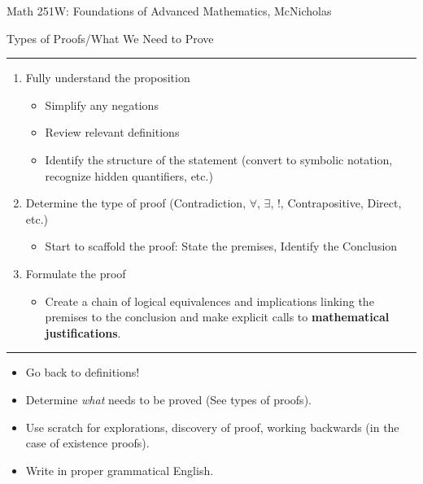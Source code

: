 \documentclass{article}
\begin{document}
	\newpage
	\hfill\tiny{Math 251W: Foundations of Advanced Mathematics, McNicholas}

	\vspace{0.3cm}
	\centerline{\Large{Types of Proofs/What We Need to Prove}}
	\vspace{0.3cm}
	\hrule
	\vspace{0.3cm}
	\vspace{.5cm}

	\normalsize
	\begin{enumerate}
		\item Fully understand the proposition
		\begin{itemize}
			\item Simplify any negations
			\item Review relevant definitions
			\item Identify the structure of the statement (convert to symbolic notation, recognize hidden quantifiers, etc.)
		\end{itemize}
		\item Determine the type of proof (Contradiction, $\forall$, $\exists$, $!$, Contrapositive, Direct, etc.)
		\begin{itemize}
			\item Start to scaffold the proof: State the premises,
			Identify the Conclusion
		\end{itemize}
		\item Formulate the proof
		\begin{itemize}

			\item Create a chain of logical equivalences and implications linking the premises to the conclusion and make explicit calls to \textbf{mathematical justifications}.
		\end{itemize}
	\end{enumerate}

	\vspace{.25cm}
	\hrule

	\vspace{.5cm}

	\begin{itemize}
		\item Go back to definitions!
		\item Determine \emph{what} needs to be proved (See types of proofs).
		\item Use scratch for explorations, discovery of proof, working backwards (in the case of existence proofs).
		\item Write in proper grammatical English.
	\end{itemize}
\end{document}
